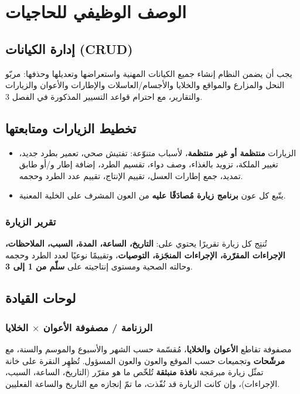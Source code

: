 \chapter{الوصف الوظيفي للحاجيات}

\section{إدارة الكيانات (CRUD)}
يجب أن يضمن النظام إنشاء جميع الكيانات المهنية واستعراضها وتعديلها وحذفها:
مربّو النحل والمزارع والمواقع والخلايا والأجسام/العاسلات والإطارات والأعوان
والزيارات والتقارير، مع احترام قواعد التسيير المذكورة في الفصل 3.

\section{تخطيط الزيارات ومتابعتها}
\begin{itemize}
  \item الزيارات \textbf{منتظمة أو غير منتظمة}، لأسباب متنوّعة: تفتيش صحي،
        تعمير بطرد جديد، تغيير الملكة، تزويد بالغذاء، وصف دواء، تقسيم الطرد،
        إضافة إطار و/أو طابق تمديد، جمع إطارات العسل، تقييم الإنتاج، تقييم عدد
        الطرد وحجمه.
  \item يتّبع كل عون \textbf{برنامج زيارة مُصادَقًا عليه} من العون المشرف على الخلية المعنية.
\end{itemize}

\subsection{تقرير الزيارة}
تُنتِج كل زيارة تقريرًا يحتوي على: \textbf{التاريخ، الساعة، المدة، السبب،
الملاحظات، الإجراءات المقرّرة، الإجراءات المنجَزة، التوصيات}، وتقييمًا نوعيًا
لعدد الطرد وحجمه وحالته الصحية ومستوى إنتاجيته على \textbf{سلّم من 1 إلى 3}.

\section{لوحات القيادة}

\subsection{الرزنامة / مصفوفة الأعوان $\times$ الخلايا}
مصفوفة تقاطع \textbf{الأعوان والخلايا}، مُقسّمة حسب الشهر والأسبوع والموسم
والسنة، مع \textbf{مرشّحات} وتجميعات حسب الموقع والعون والعون المسؤول. تُظهِر
النقرة على خانة تمثّل زيارة مبرمَجة \textbf{نافذة منبثقة} تُلخّص ما هو مقرّر
(التاريخ، الساعة، السبب، الإجراءات)، وإن كانت الزيارة قد نُفّذت، ما تمّ إنجازه
مع التاريخ والساعة الفعليين.

